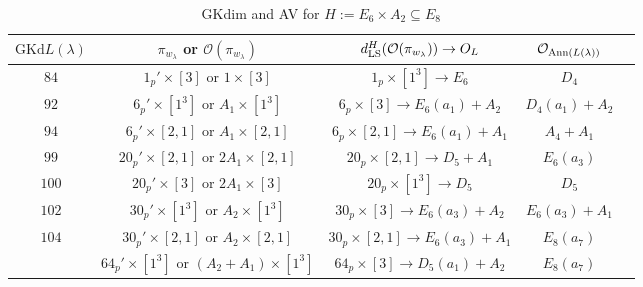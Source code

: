 \documentclass[reqno,12pt]{amsart}
\numberwithin{equation}{section}
\theoremstyle{plain}
\theoremstyle{definition}
\newcommand{\lam}{\lambda}
\renewcommand{\subset}{\subseteq}
\begin{document}
\begin{table}[htbp]\caption{GKdim and AV for $H:=E_6 \times A_2 \subset E_8$ }
	\label{tabe6a2}
	\centering
	\renewcommand{\arraystretch}{1.5}
	\setlength\tabcolsep{5pt}

	\begin{tabular}{|c|c|c|c|c|}
		\hline $\mathrm{GKd} L(\lambda)$&${\pi_{w_{\lam}}}$ or $\mathcal{O}(\pi_{w_{\lam}})$& $d_{\rm LS}^{H}(\mathcal{O}(\pi_{w_\lambda}))\rightarrow O_{L}$& $\mathcal{O}_{{\rm Ann}(L(\lambda))}$ \\ \hline
          $ 84 $    &  $ 1_p'\times[3] $ or $1\times [3]$ &   $1_p\times[1^3]\rightarrow E_6 $     &   $ D_4$      \\ \hline
        $92$ &  $6_p'\times [1^3] $ or $A_1\times [1^3]$ &  $6_p\times[3]\rightarrow E_6(a_1)+A_2 $     &   $ D_4(a_1)+A_2$      \\ \hline
      $94$   &  $ 6_p'\times [2,1]$ or $A_1\times [2,1]$ & $6_p\times[2,1]\rightarrow E_6(a_1)+A_1$     &   $A_4+A_1$      \\ \hline
     $99$    &  $20_p'\times [2,1] $ or $2A_1\times [2,1]$ & $20_p\times[2,1]\rightarrow  D_5+A_1 $     &   $ E_6(a_3)$      \\ \hline
    $100$     & $20_p'\times [3] $ or $2A_1\times [3]$  & $ 20_p\times[1^3]\rightarrow  D_5 $     &   $ D_5$   \\\hline

         $ 102 $    &  $30_p'\times [1^3] $ or $A_2\times [1^3]$ &  $30_p\times[3]\rightarrow  E_6(a_3)+A_2 $     &   $ E_6(a_3)+A_1$      \\ 
          \hline

          $ 104 $    & $30_p'\times [2,1] $ or $A_2\times [2,1]$ &  $30_p\times[2,1]\rightarrow E_6(a_3)+A_1 $     &   $ E_8(a_7)$   \\ 
          &  $64_p'\times [1^3] $ or $(A_2+A_1)\times [1^3]$ &  $64_p\times[3]\rightarrow D_5(a_1)+A_2 $     &   $ E_8(a_7)$   \\   \hline
	

\end{tabular}
\end{table}
\end{document}
